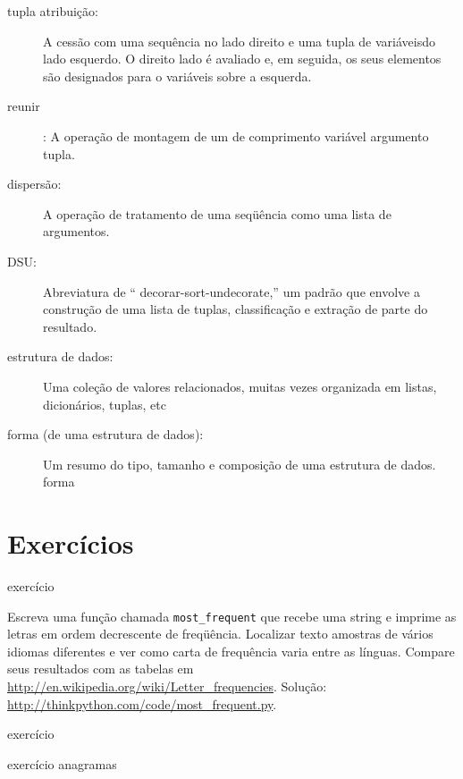 \documentclass[10pt]{book}
\begin{document}
\begin{v erbatim}
\begin{description}
\item[tupla atribuição:] A cessão com uma sequência no
lado direito e uma tupla de variáveis ​​do lado esquerdo. O direito
lado é avaliado e, em seguida, os seus elementos são designados para o
variáveis ​​sobre a esquerda.

\item[reunir]: A operação de montagem de um de comprimento variável
argumento tupla.

\item[dispersão:] A operação de tratamento de uma seqüência como uma lista de
argumentos.

\item[DSU:] Abreviatura de `` decorar-sort-undecorate,'' um
padrão que envolve a construção de uma lista de tuplas, classificação e
extração de parte do resultado.

\item[estrutura de dados:] Uma coleção de valores relacionados, muitas vezes
organizada em listas, dicionários, tuplas, etc

\item[forma (de uma estrutura de dados):] Um resumo do tipo,
tamanho e composição de uma estrutura de dados.
\index{} forma

\end{description}


\section{Exercícios}

\begin{} exercício

Escreva uma função chamada \verb "most_frequent" que recebe uma string e
imprime as letras em ordem decrescente de freqüência. Localizar texto
amostras de vários idiomas diferentes e ver como carta de frequência
varia entre as línguas. Compare seus resultados com as tabelas em
\url{http://en.wikipedia.org/wiki/Letter_frequencies}. Solução:
\url{http://thinkpython.com/code/most_frequent.py}.  

\end{} exercício


\begin{} exercício
\label{} anagramas


\end{}
\end{v erbatim}
\end{document}
